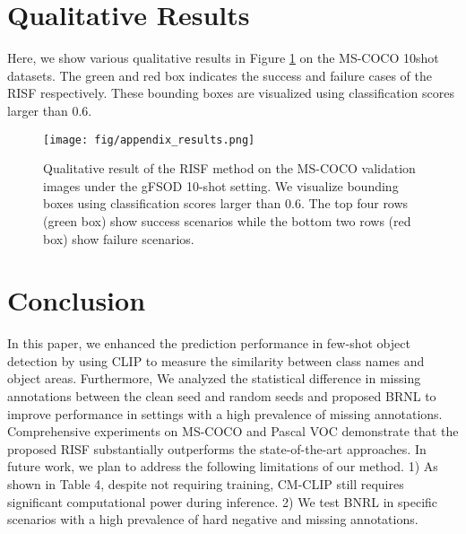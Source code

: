 \documentclass{article}
\begin{document}
\section{Qualitative Results}

Here, we show various qualitative results in Figure  \ref{fig:qualitative} on the MS-COCO 10shot datasets.
The green and red box indicates the success and failure cases of the RISF respectively.
These bounding boxes are visualized using classification scores larger than 0.6.





\begin{figure}[hbt!]
    \centering
    \texttt{[image: fig/appendix\_results.png]}
    \caption{Qualitative result of the RISF method on the MS-COCO validation images under the gFSOD 10-shot setting. 
    We visualize bounding boxes using classification scores larger than 0.6.
    The top four rows (green box) show success scenarios while the bottom two rows (red box) show failure scenarios.
    }
    \label{fig:qualitative}
\end{figure}



\section{Conclusion}

In this paper, we enhanced the prediction performance in few-shot object detection by using CLIP to measure the similarity between class names and object areas.
Furthermore, We analyzed the statistical difference in missing annotations between the clean seed and random seeds and proposed BRNL to improve performance in settings with a high prevalence of missing annotations.
Comprehensive experiments on MS-COCO and Pascal VOC demonstrate that the proposed RISF substantially outperforms the state-of-the-art approaches.
In future work, we plan to address the following limitations of our method.
1) As shown in Table 4, despite not requiring training, CM-CLIP still requires significant computational power during inference.
2) We test BNRL in specific scenarios with a high prevalence of hard negative and missing annotations. 



\end{document}
